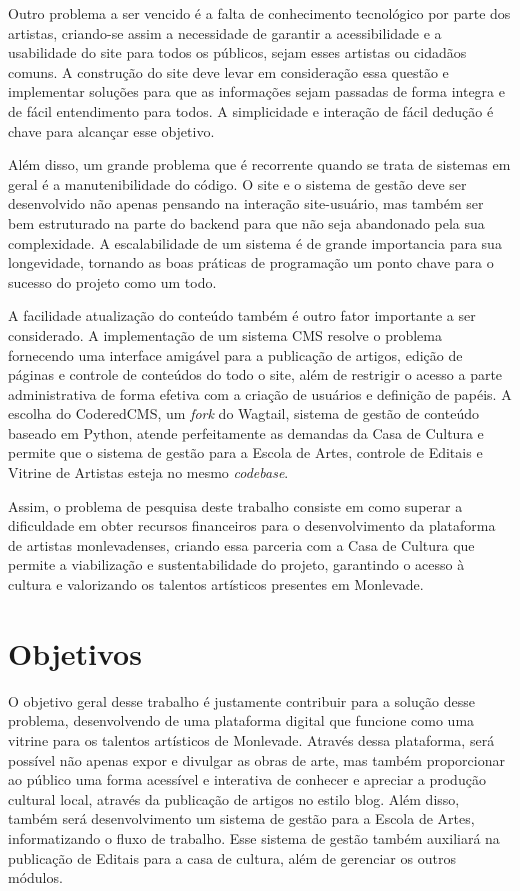 Outro problema a ser vencido é a falta de conhecimento tecnológico por parte dos artistas, criando-se assim a necessidade de garantir a acessibilidade e a usabilidade do site para todos os públicos, sejam esses artistas ou cidadãos comuns. A construção do site deve levar em consideração essa questão e implementar soluções para que as informações sejam passadas de forma integra e de fácil entendimento para todos. A simplicidade e interação de fácil dedução é chave para alcançar esse objetivo.

Além disso, um grande problema que é recorrente quando se trata de sistemas em geral é a manutenibilidade do código. O site e o sistema de gestão deve ser desenvolvido não apenas pensando na interação site-usuário, mas também ser bem estruturado na parte do backend para que não seja abandonado pela sua complexidade. A escalabilidade de um sistema é de grande importancia para sua longevidade, tornando as boas práticas de programação um ponto chave para o sucesso do projeto como um todo.

A facilidade atualização do conteúdo também é outro fator importante a ser considerado. A implementação de um sistema CMS resolve o problema fornecendo uma interface amigável para a publicação de artigos, edição de páginas e controle de conteúdos do todo o site, além de restrigir o acesso a parte administrativa de forma efetiva com a criação de usuários e definição de papéis. A escolha do CoderedCMS, um \textit{fork} do Wagtail, sistema de gestão de conteúdo baseado em Python, atende perfeitamente as demandas da Casa de Cultura e permite que o sistema de gestão para a Escola de Artes, controle de Editais e Vitrine de Artistas esteja no mesmo \textit{codebase}.

Assim, o problema de pesquisa deste trabalho consiste em como superar a dificuldade em obter recursos financeiros para o desenvolvimento da plataforma de artistas monlevadenses, criando essa parceria com a Casa de Cultura que permite a viabilização e sustentabilidade do projeto, garantindo o acesso à cultura e valorizando os talentos artísticos presentes em Monlevade.

\section{Objetivos}
\label{sec:objetivos}

O objetivo geral desse trabalho é justamente contribuir para a solução desse problema, desenvolvendo de uma plataforma digital que funcione como uma vitrine para os talentos artísticos de Monlevade. Através dessa plataforma, será possível não apenas expor e divulgar as obras de arte, mas também proporcionar ao público uma forma acessível e interativa de conhecer e apreciar a produção cultural local, através da publicação de artigos no estilo blog. Além disso, também será desenvolvimento um sistema de gestão para a Escola de Artes, informatizando o fluxo de trabalho. Esse sistema de gestão também auxiliará na publicação de Editais para a casa de cultura, além de gerenciar os outros módulos.


